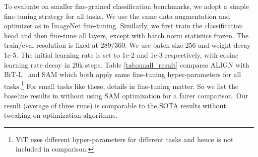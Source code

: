 \documentclass{article}
\begin{document}
\begin{table}[h!]
\vspace{-5mm}
\begin{center}
\caption{VTAB (19 tasks) comparison between ALIGN and BiT-L.}
\label{tab:vtab_result}
\vskip -0.1in
\label{tab:vtab}
\begin{small}
\end{small}
\end{center}
\vspace{-5mm}
\end{table}

To evaluate on smaller fine-grained classification benchmarks, we adopt a simple fine-tuning strategy for all tasks. We use the same data augmentation and optimizer as in ImageNet fine-tuning. Similarly, we first train the classification head and then fine-tune all layers, except with batch norm statistics frozen. The train/eval resolution is fixed at 289/360. We use batch size 256 and weight decay 1e-5. The initial learning rate is set to 1e-2 and 1e-3 respectively, with cosine learning rate decay in 20k steps. Table \ref{tab:small_result} compares ALIGN with BiT-L~\cite{kolensnikov:bit} and SAM \cite{foret:sam} which both apply same fine-tuning hyper-parameters for all tasks.\footnote{ViT \cite{dosovitskiy:vit} uses different hyper-parameters for different tasks and hence is not included in comparison.} For small tasks like these, details in fine-tuning matter. So we list the baseline results in \cite{foret:sam} without using SAM optimization for a fairer comparison. Our result (average of three runs) is comparable to the SOTA results without tweaking on optimization algorithms.
\end{document}
